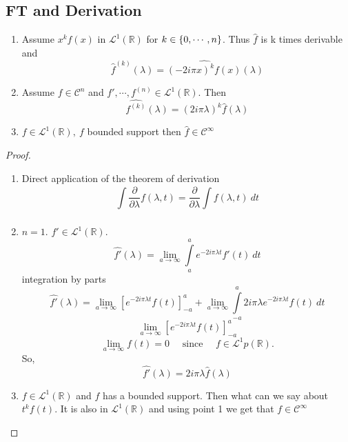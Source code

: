 \subsection{FT and Derivation}
\label{subsec:FT and Derivation}
\begin{enumerate}
    \item Assume $ x^kf(x) $ in $ \mathscr{L}^1\left( \mathbb{R}\right)   $ 
        for $ k\in \set{ 0,\cdots,n }  $. Thus $ \widehat{f}  $ is k times derivable and 
\[
    \widehat{f} _{  }^{ (k) } (\lambda) = \widehat{\left( -2i\pi x\right) ^k f(x) } \left(
    \lambda \right) 
\]
    \item Assume $ f\in \mathscr{ C } ^n $ and $ f', \cdots, f^{(n)} \in
        \mathscr{L}^1\left( \mathbb{R}\right)  $.
    Then 
    \[
        \widehat{f^{(k)}}\left( \lambda \right) = \left( 2i\pi\lambda \right) ^k
        \widehat{f}\left( \lambda\right) 
    \]
    \item $ f\in \mathscr{L}^1\left( \mathbb{R}\right),\ f   $ bounded support then $
        \widehat{f} \in \mathscr{ C } ^{\infty}  $
\end{enumerate}
\begin{proof}
    \begin{enumerate}
        \item Direct application of the theorem of derivation 
            \[
            \int\limits_{ }^{ } \frac{ \partial  }{ \partial \lambda  } f\left( \lambda,
            t\right)  = \frac{ \partial  }{ \partial \lambda  } \int\limits_{ }^{ }
            f(\lambda, t) \ dt
            \]
        \item $ n = 1 $. $ f' \in \mathscr{L}^1\left( \mathbb{R}\right)   $. 
            \[
                \widehat{f'}\left( \lambda\right) = \lim_{a\to\infty}
                \int\limits_{a}^{a} e^{ -2i\pi\lambda t} f'(t) \ dt 
            \] integration by parts 
            \[
                \widehat{f'}\left( \lambda \right) = \lim_{a\to\infty} \left[ e^{
                -2i\pi\lambda t} f(t)  \right] ^a_{-a} + \lim_{a\to\infty}
                \int\limits_{-a}^{a } 2i\pi\lambda e^{ -2i\pi \lambda t } f(t) \ dt       
            \]
            \[
                \lim_{a\to\infty} \left[ e^{ -2i\pi\lambda t} f(t) \right] _{ -a }^{ a }  
            \]
            \[
                \lim_{a\to\infty} f(t) = 0 \quad \text{ since } \quad f\in
                \mathscr{L}^1p\left( \mathbb{R}\right) .  
            \]
            So, 
            \[
                \widehat{f'}\left( \lambda \right) = 2i\pi\lambda \widehat{f}\left(
                \lambda \right) 
            \]

     \item $ f\in \mathscr{L}^1\left( \mathbb{R}\right)  $ and $ f $ has a bounded
         support. Then what can we say about $ t^kf(t)  $. It is also in $
         \mathscr{L}^1\left( \mathbb{R}\right)   $ and using point 1 we get that $ f\in
         \mathscr{ C } ^{\infty}  $
    \end{enumerate}
\end{proof}
